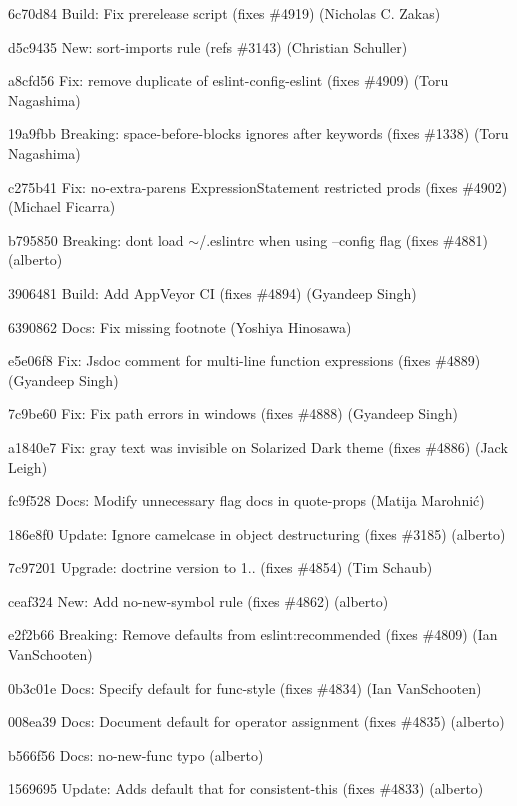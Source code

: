 \begin{DoxyItemize}
\item 6c70d84 Build\+: Fix prerelease script (fixes \#4919) (Nicholas C. Zakas)
\item d5c9435 New\+: \textquotesingle{}sort-\/imports\textquotesingle{} rule (refs \#3143) (Christian Schuller)
\item a8cfd56 Fix\+: remove duplicate of eslint-\/config-\/eslint (fixes \#4909) (Toru Nagashima)
\item 19a9fbb Breaking\+: {\ttfamily space-\/before-\/blocks} ignores after keywords (fixes \#1338) (Toru Nagashima)
\item c275b41 Fix\+: no-\/extra-\/parens Expression\+Statement restricted prods (fixes \#4902) (Michael Ficarra)
\item b795850 Breaking\+: don\textquotesingle{}t load \texorpdfstring{$\sim$}{\string~}/.eslintrc when using --config flag (fixes \#4881) (alberto)
\item 3906481 Build\+: Add App\+Veyor CI (fixes \#4894) (Gyandeep Singh)
\item 6390862 Docs\+: Fix missing footnote (Yoshiya Hinosawa)
\item e5e06f8 Fix\+: Jsdoc comment for multi-\/line function expressions (fixes \#4889) (Gyandeep Singh)
\item 7c9be60 Fix\+: Fix path errors in windows (fixes \#4888) (Gyandeep Singh)
\item a1840e7 Fix\+: gray text was invisible on Solarized Dark theme (fixes \#4886) (Jack Leigh)
\item fc9f528 Docs\+: Modify unnecessary flag docs in quote-\/props (Matija Marohnić)
\item 186e8f0 Update\+: Ignore camelcase in object destructuring (fixes \#3185) (alberto)
\item 7c97201 Upgrade\+: doctrine version to 1.. (fixes \#4854) (Tim Schaub)
\item ceaf324 New\+: Add no-\/new-\/symbol rule (fixes \#4862) (alberto)
\item e2f2b66 Breaking\+: Remove defaults from {\ttfamily eslint\+:recommended} (fixes \#4809) (Ian Van\+Schooten)
\item 0b3c01e Docs\+: Specify default for func-\/style (fixes \#4834) (Ian Van\+Schooten)
\item 008ea39 Docs\+: Document default for operator assignment (fixes \#4835) (alberto)
\item b566f56 Docs\+: no-\/new-\/func typo (alberto)
\item 1569695 Update\+: Adds default \textquotesingle{}that\textquotesingle{} for consistent-\/this (fixes \#4833) (alberto)

\end{DoxyItemize}
